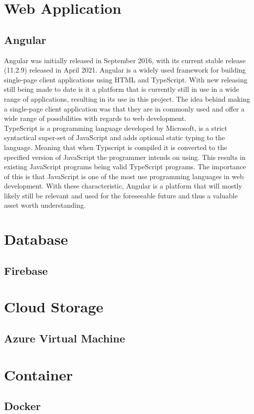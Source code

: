 \section{Web Application}
\subsection{Angular}
Angular was initially released in September 2016, with its current stable release (11.2.9) released in April 2021.  Angular is a widely used framework for building single-page client applications using HTML and TypeScript.  With new releasing still being made to date is it a platform that is currently still in use in a wide range of applications, resulting in its use in this project.  The idea behind making a single-page client application was that they are in commonly used and offer a wide range of possibilities with regards to web development. \\

TypeScript is a programming language developed by Microsoft, is a strict syntactical super-set of JavaScript and adds optional static typing to the language.  Meaning that when Typscript is compiled it is converted to the specified version of JavaScript the programmer intends on using.  This results in existing JavaScript programs being valid TypeScript programs.  The importance of this is that JavaScript is one of the most use programming languages in web development.  With these characteristic, Angular is a platform that will mostly likely still be relevant and used for the foreseeable future and thus a valuable asset worth understanding.

\section{Database}
\subsection{Firebase}

\section{Cloud Storage}
\subsection{Azure Virtual Machine}

\section{Container}
\subsection{Docker}
